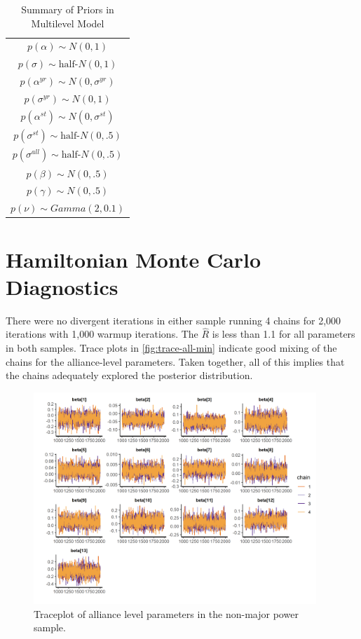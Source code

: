 \documentclass[12pt]{article}
\begin{document}
\begin{table} %
\begin{center}
\begin{tabular}{c} 
$ p(\alpha) \sim N(0, 1)$  \\
$ p(\sigma) \sim \mbox{half-}N(0, 1) $ \\
$ p(\alpha^{yr}) \sim N(0, \sigma^{yr}) $ \\ 
$ p(\sigma^{yr}) \sim N(0, 1) $ \\
$ p(\alpha^{st}) \sim N(0, \sigma^{st}) $ \\ 
$ p(\sigma^{st}) \sim \mbox{half-}N(0, .5) $ \\ 
$ p(\sigma^{all}) \sim \mbox{half-}N(0, .5) $ \\
$ p(\beta) \sim N(0, .5) $ \\
$ p(\gamma) \sim N(0, .5) $ \\ 
$ p(\nu) \sim Gamma(2, 0.1)$ 
\end{tabular} 
\caption{Summary of Priors in Multilevel Model} 
\label{tab:priors}
\end{center} 
\end{table} 


\section{Hamiltonian Monte Carlo Diagnostics}

There were no divergent iterations in either sample running 4 chains for 2,000 iterations with 1,000 warmup iterations. 
The $\hat{R}$ is less than 1.1 for all parameters in both samples. 
Trace plots in \autoref{fig:trace-all-min} indicate good mixing of the chains for the alliance-level parameters. 
Taken together, all of this implies that the chains adequately explored the posterior distribution. 

\begin{figure}[htbp]
	\centering
		\includegraphics[width=0.95\textwidth]{trace-all-min.png}
	\caption{Traceplot of alliance level parameters in the non-major power sample.}
	\label{fig:trace-all-min}
\end{figure}
\end{document}
